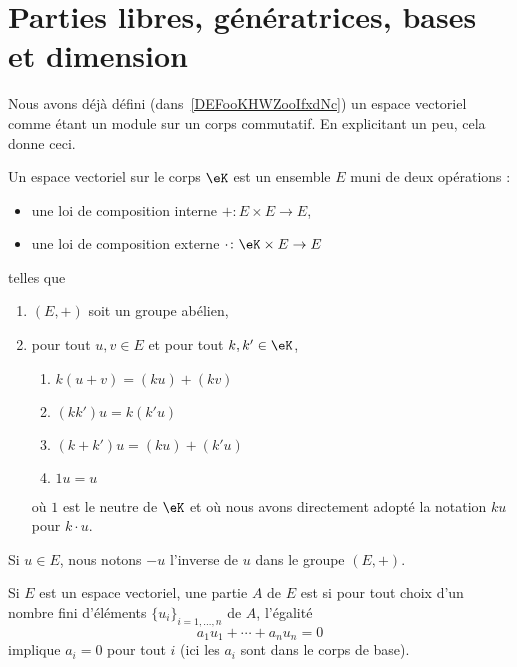 
\section{Parties libres, génératrices, bases et dimension}

Nous avons déjà défini (dans~\ref{DEFooKHWZooIfxdNc}) un espace vectoriel comme étant un module sur un corps commutatif. En explicitant un peu, cela donne ceci\cite{ooQLVLooEUrNLS}.

Un espace vectoriel sur le corps \( \eK\) est un ensemble \( E\) muni de deux opérations :
\begin{itemize}
	\item une loi de composition interne \( +\colon E\times E\to E\),
	\item une loi de composition externe \( \cdot\colon \eK\times E\to E\)
\end{itemize}
telles que
\begin{enumerate}
	\item
	      \( (E,+)\) soit un groupe abélien,
	\item
	      pour tout \( u,v\in E\) et pour tout \( k,k'\in \eK\),
          \begin{enumerate}
              \item
			      $k(u+v)=(ku)+(kv)$  
              \item
			      $(kk')u=k(k'u)$
              \item
			      $(k+k')u=(ku)+(k'u)$
              \item
			      $1u=u$
          \end{enumerate}
	      où \( 1\) est le neutre de \( \eK\) et où nous avons directement adopté la notation \( ku\) pour \( k\cdot u\).
\end{enumerate}
Si \( u\in E\), nous notons \( -u\) l'inverse de \( u\) dans le groupe \( (E,+)\).

\begin{definition}
	Si \( E\) est un espace vectoriel, une partie \( A\) de \( E\) est  si pour tout choix d'un nombre fini d'éléments \( \{ u_i \}_{i=1,\ldots, n}\) de \( A\), l'égalité
	\begin{equation}
		a_1 u_1+\cdots +a_nu_n=0
	\end{equation}
	implique \( a_i=0\) pour tout \( i\) (ici les \( a_i\) sont dans le corps de base).

\end{definition}

